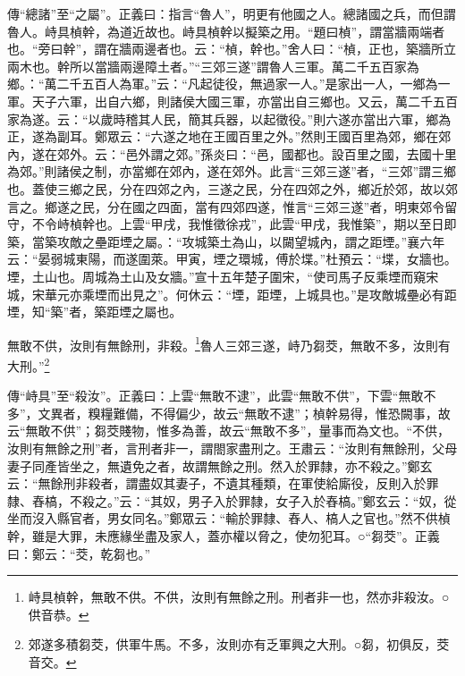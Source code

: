 {\noindent\zhuan{}\fzbyks 傳“總諸”至“之屬”。正義曰：指言“魯人”，明更有他國之人。總諸國之兵，而但謂魯人。峙具楨幹，為道近故也。峙具楨幹以擬築之用。“題曰楨”，謂當牆兩端者也。“旁曰幹”，謂在牆兩邊者也。云：“楨，幹也。”舍人曰：“楨，正也，築牆所立兩木也。幹所以當牆兩邊障土者。”“三郊三遂”謂魯人三軍。萬二千五百家為鄉。：“萬二千五百人為軍。”云：“凡起徒役，無過家一人。”是家出一人，一鄉為一軍。天子六軍，出自六鄉，則諸侯大國三軍，亦當出自三鄉也。又云，萬二千五百家為遂。云：“以歲時稽其人民，簡其兵器，以起徵役。”則六遂亦當出六軍，鄉為正，遂為副耳。鄭眾云：“六遂之地在王國百里之外。”然則王國百里為郊，鄉在郊內，遂在郊外。云：“邑外謂之郊。”孫炎曰：“邑，國都也。設百里之國，去國十里為郊。”則諸侯之制，亦當鄉在郊內，遂在郊外。此言“三郊三遂”者，“三郊”謂三鄉也。蓋使三鄉之民，分在四郊之內，三遂之民，分在四郊之外，鄉近於郊，故以郊言之。鄉遂之民，分在國之四面，當有四郊四遂，惟言“三郊三遂”者，明東郊令留守，不令峙楨幹也。上雲“甲戌，我惟徵徐戎”，此雲“甲戌，我惟築”，期以至日即築，當築攻敵之壘距堙之屬。：“攻城築土為山，以闚望城內，謂之距堙。”襄六年云：“晏弱城東陽，而遂圍萊。甲寅，堙之環城，傅於堞。”杜預云：“堞，女牆也。堙，土山也。周城為土山及女牆。”宣十五年楚子圍宋，“使司馬子反乘堙而窺宋城，宋華元亦乘堙而出見之”。何休云：“堙，距堙，上城具也。”是攻敵城壘必有距堙，知“築”者，築距堙之屬也。 \par}

無敢不供，汝則有無餘刑，非殺。\footnote{峙具楨幹，無敢不供。不供，汝則有無餘之刑。刑者非一也，然亦非殺汝。○供音恭。}魯人三郊三遂，峙乃芻茭，無敢不多，汝則有大刑。”\footnote{郊遂多積芻茭，供軍牛馬。不多，汝則亦有乏軍興之大刑。○芻，初俱反，茭音交。}

{\noindent\zhuan{}\fzbyks 傳“峙具”至“殺汝”。正義曰：上雲“無敢不逮”，此雲“無敢不供”，下雲“無敢不多”，文異者，糗糧難備，不得偏少，故云“無敢不逮”；楨幹易得，惟恐闕事，故云“無敢不供”；芻茭賤物，惟多為善，故云“無敢不多”，量事而為文也。“不供，汝則有無餘之刑”者，言刑者非一，謂閤家盡刑之。王肅云：“汝則有無餘刑，父母妻子同產皆坐之，無遺免之者，故謂無餘之刑。然入於罪隸，亦不殺之。”鄭玄云：“無餘刑非殺者，謂盡奴其妻子，不遺其種類，在軍使給廝役，反則入於罪隸、舂槁，不殺之。”云：“其奴，男子入於罪隸，女子入於舂槁。”鄭玄云：“奴，從坐而沒入縣官者，男女同名。”鄭眾云：“輸於罪隸、舂人、槁人之官也。”然不供楨幹，雖是大罪，未應緣坐盡及家人，蓋亦權以脅之，使勿犯耳。○“芻茭”。正義曰：鄭云：“茭，乾芻也。” \par}

